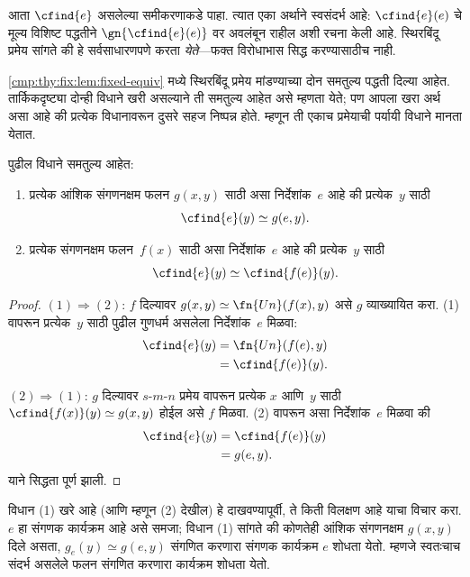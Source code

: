 आता $\cfind{e}$ असलेल्या समीकरणाकडे पाहा. त्यात एका
अर्थाने स्वसंदर्भ आहे: $\cfind{e}(e)$ चे मूल्य विशिष्ट
पद्धतीने $\gn{\cfind{e}(e)}$ वर अवलंबून राहील अशी
रचना केली आहे. स्थिरबिंदू प्रमेय सांगते की हे सर्वसाधारणपणे
करता {\em येते}—फक्त विरोधाभास सिद्ध करण्यासाठीच नाही.

\ref{cmp:thy:fix:lem:fixed-equiv} मध्ये स्थिरबिंदू प्रमेय मांडण्याच्या
दोन समतुल्य पद्धती दिल्या आहेत. तार्किकदृष्ट्या दोन्ही
विधाने खरी असल्याने ती समतुल्य आहेत असे म्हणता येते;
पण आपला खरा अर्थ असा आहे की प्रत्येक विधानावरून दुसरे
सहज निष्पन्न होते. म्हणून ती एकाच प्रमेयाची पर्यायी विधाने
मानता येतात.

\begin{lem}
\label{cmp:thy:fix:lem:fixed-equiv}
पुढील विधाने समतुल्य आहेत:
\begin{enumerate}
\item प्रत्येक आंशिक संगणनक्षम फलन $g(x,y)$ साठी असा
  निर्देशांक~$e$ आहे की प्रत्येक~$y$ साठी
\[\cfind{e}(y) \simeq g(e,y).
\]
\item प्रत्येक संगणनक्षम फलन~$f(x)$ साठी असा निर्देशांक~$e$
  आहे की प्रत्येक~$y$ साठी
\[\cfind{e}(y) \simeq \cfind{f(e)}(y).
\]
\end{enumerate}
\end{lem}

\begin{proof}
$(1) \Rightarrow (2)$: $f$ दिल्यावर $g(x,y) \simeq
\fn{Un}(f(x),y)$ असे $g$ व्याख्यायित करा. (1) वापरून
प्रत्येक~$y$ साठी पुढील गुणधर्म असलेला निर्देशांक~$e$
मिळवा:
\begin{align*}
\cfind{e}(y) & = \fn{Un}(f(e),y) \\
& = \cfind{f(e)}(y).
\end{align*}

$(2) \Rightarrow (1)$: $g$ दिल्यावर $s$-$m$-$n$
प्रमेय वापरून प्रत्येक $x$ आणि~$y$ साठी
$\cfind{f(x)}(y) \simeq g(x,y)$ होईल असे $f$ मिळवा.
(2) वापरून असा निर्देशांक~$e$ मिळवा की
\begin{align*}
\cfind{e}(y) & = \cfind{f(e)}(y) \\
& = g(e,y).
\end{align*}
याने सिद्धता पूर्ण झाली.
\end{proof}

\begin{explain}
विधान (1) खरे आहे (आणि म्हणून (2) देखील) हे दाखवण्यापूर्वी,
ते किती विलक्षण आहे याचा विचार करा. $e$ हा संगणक
कार्यक्रम आहे असे समजा; विधान (1) सांगते की कोणतेही
आंशिक संगणनक्षम $g(x,y)$ दिले असता, $g_e(y) \simeq g(e,y)$
संगणित करणारा संगणक कार्यक्रम $e$ शोधता येतो. म्हणजे
स्वतःचाच संदर्भ असलेले फलन संगणित करणारा कार्यक्रम शोधता येतो.
\end{explain}

